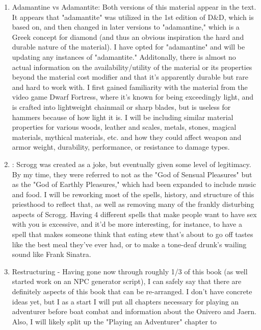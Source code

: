 \begin{enumerate}[leftmargin=12pt]
\item Adamantine vs Adamantite: Both versions of this material appear in the text. It appears that "adamantite" was utilized in the 1st edition of D\&D, which \aq is based on, and then changed in later versions to "adamantine," which is a Greek concept for diamond (and thus an obvious inspiration the hard and durable nature of the material). I have opted for "adamantine" and will be updating any instances of "adamantite." Additonally, there is almost no actual information on the availability/utility of the material or its properties beyond the material cost modifier and that it's apparently durable but rare and hard to work with. I first gained familiarity with the material from the video game Dwarf Fortress, where it's known for being exceedingly light, and is crafted into lightweight chainmail or sharp blades, but is useless for hammers because of how light it is. I will be including similar material properties for various woods, leather and scales, metals, stones, magical materials, mythical materials, etc. and how they could affect weapon and armor weight, durability, performance, or resistance to damage types.
\item {}: Scrogg was created as a joke, but eventually given some level of legitimacy. By my time, they were referred to not as the "God of Sensual Pleasures" but as the "God of Earthly Pleasures," which had been expanded to include music and food. I will be reworking most of the spells, history, and structure of this priesthood to reflect that, as well as removing many of the frankly disturbing aspects of Scrogg. Having 4 different spells that make people want to have sex with you is excessive, and it'd be more interesting, for instance, to have a spell that makes someone think that eating stew that's about to go off tastes like the best meal they've ever had, or to make a tone-deaf drunk's wailing sound like Frank Sinatra. 
\item Restructuring - Having gone now through roughly 1/3 of this book (as well started work on an NPC generator script), I can safely say that there are definitely aspects of this book that can be re-arranged. I don't have concrete ideas yet, but I as a start I will put all chapters necessary for playing an adventurer before boat combat and information about the Onivero and Jaern. Also, I will likely split up the "Playing an Adventurer" chapter to 
\end{enumerate}
